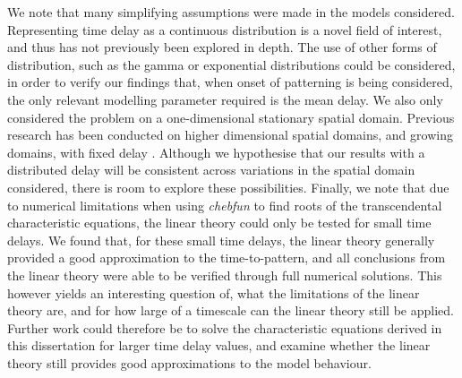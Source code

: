 We note that many simplifying assumptions were made in the models considered. Representing time delay as a continuous distribution is a novel field of interest, and thus has not previously been explored in depth. The use of other forms of distribution, such as the gamma or exponential distributions could be considered, in order to verify our findings that, when onset of patterning is being considered, the only relevant modelling parameter required is the mean delay. We also only considered the problem on a one-dimensional stationary spatial domain. Previous research has been conducted on higher dimensional spatial domains, and growing domains, with fixed delay \cite{gaffmonk,krausefixed}. Although we hypothesise that our results with a distributed delay will be consistent across variations in the spatial domain considered, there is room to explore these possibilities. Finally, we note that due to numerical limitations when using \textit{chebfun} to find roots of the transcendental characteristic equations, the linear theory could only be tested for small time delays. We found that, for these small time delays, the linear theory generally provided a good approximation to the time-to-pattern, and all conclusions from the linear theory were able to be verified through full numerical solutions. This however yields an interesting question of, what the limitations of the linear theory are, and for how large of a timescale can the linear theory still be applied. Further work could therefore be  to solve the characteristic equations derived in this dissertation for larger time delay values, and examine whether the linear theory still provides good approximations to the model behaviour.
